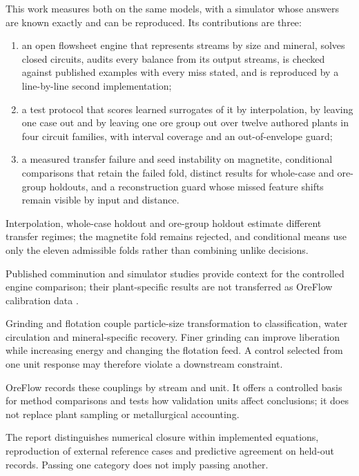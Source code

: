 \documentclass[10pt]{article}
\providecommand{\tightlist}{\setlength{\itemsep}{0pt}\setlength{\parskip}{0pt}}
\begin{document}
This work measures both on the same models, with a simulator whose
answers are known exactly and can be reproduced. Its contributions are
three:

\begin{enumerate}
\def\labelenumi{\arabic{enumi}.}
\tightlist
\item
  an open flowsheet engine that represents streams by size and mineral,
  solves closed circuits, audits every balance from its output streams,
  is checked against published examples with every miss stated, and is
  reproduced by a line-by-line second implementation;
\item
  a test protocol that scores learned surrogates of it by interpolation,
  by leaving one case out and by leaving one ore group out over twelve
  authored plants in four circuit families, with interval coverage and
  an out-of-envelope guard;
\item
  a measured transfer failure and seed instability on magnetite,
  conditional comparisons that retain the failed fold, distinct results
  for whole-case and ore-group holdouts, and a reconstruction guard
  whose missed feature shifts remain visible by input and distance.
\end{enumerate}

\begin{sloppypar}
Interpolation, whole-case holdout and ore-group holdout estimate different
transfer regimes; the magnetite fold remains rejected, and conditional means
use only the eleven admissible folds rather than combining unlike decisions.

Published comminution and simulator studies provide context for the
controlled engine comparison; their plant-specific results are not
transferred as OreFlow calibration data \cite{whiten1972,koh2021}.

Grinding and flotation couple particle-size transformation to
classification, water circulation and mineral-specific recovery. Finer
grinding can improve liberation while increasing energy and changing the
flotation feed. A control selected from one unit response may therefore
violate a downstream constraint.

OreFlow records these couplings by stream and unit. It offers a controlled
basis for method comparisons and tests how validation units affect
conclusions; it does not replace plant sampling or metallurgical accounting.

The report distinguishes numerical closure within implemented equations,
reproduction of external reference cases and predictive agreement on
held-out records. Passing one category does not imply passing another.
\end{sloppypar}
\end{document}
